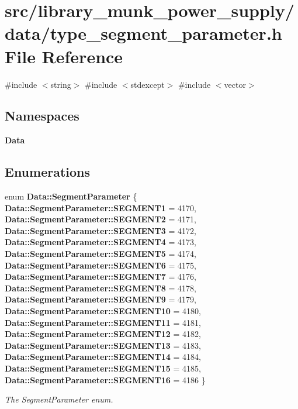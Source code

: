 \section{src/library\+\_\+munk\+\_\+power\+\_\+supply/data/type\+\_\+segment\+\_\+parameter.h File Reference}
\label{type__segment__parameter_8h}
{\ttfamily \#include $<$string$>$}\newline
{\ttfamily \#include $<$stdexcept$>$}\newline
{\ttfamily \#include $<$vector$>$}\newline
\subsection*{Namespaces}
\begin{DoxyCompactItemize}
\item 
 \textbf{ Data}
\end{DoxyCompactItemize}
\subsection*{Enumerations}
\begin{DoxyCompactItemize}
\item 
enum \textbf{ Data\+::\+Segment\+Parameter} \{ \newline
\textbf{ Data\+::\+Segment\+Parameter\+::\+S\+E\+G\+M\+E\+N\+T1} = 4170, 
\textbf{ Data\+::\+Segment\+Parameter\+::\+S\+E\+G\+M\+E\+N\+T2} = 4171, 
\textbf{ Data\+::\+Segment\+Parameter\+::\+S\+E\+G\+M\+E\+N\+T3} = 4172, 
\textbf{ Data\+::\+Segment\+Parameter\+::\+S\+E\+G\+M\+E\+N\+T4} = 4173, 
\newline
\textbf{ Data\+::\+Segment\+Parameter\+::\+S\+E\+G\+M\+E\+N\+T5} = 4174, 
\textbf{ Data\+::\+Segment\+Parameter\+::\+S\+E\+G\+M\+E\+N\+T6} = 4175, 
\textbf{ Data\+::\+Segment\+Parameter\+::\+S\+E\+G\+M\+E\+N\+T7} = 4176, 
\textbf{ Data\+::\+Segment\+Parameter\+::\+S\+E\+G\+M\+E\+N\+T8} = 4178, 
\newline
\textbf{ Data\+::\+Segment\+Parameter\+::\+S\+E\+G\+M\+E\+N\+T9} = 4179, 
\textbf{ Data\+::\+Segment\+Parameter\+::\+S\+E\+G\+M\+E\+N\+T10} = 4180, 
\textbf{ Data\+::\+Segment\+Parameter\+::\+S\+E\+G\+M\+E\+N\+T11} = 4181, 
\textbf{ Data\+::\+Segment\+Parameter\+::\+S\+E\+G\+M\+E\+N\+T12} = 4182, 
\newline
\textbf{ Data\+::\+Segment\+Parameter\+::\+S\+E\+G\+M\+E\+N\+T13} = 4183, 
\textbf{ Data\+::\+Segment\+Parameter\+::\+S\+E\+G\+M\+E\+N\+T14} = 4184, 
\textbf{ Data\+::\+Segment\+Parameter\+::\+S\+E\+G\+M\+E\+N\+T15} = 4185, 
\textbf{ Data\+::\+Segment\+Parameter\+::\+S\+E\+G\+M\+E\+N\+T16} = 4186
 \}\begin{DoxyCompactList}\small\item\em The Segment\+Parameter enum. \end{DoxyCompactList}
\end{DoxyCompactItemize}
